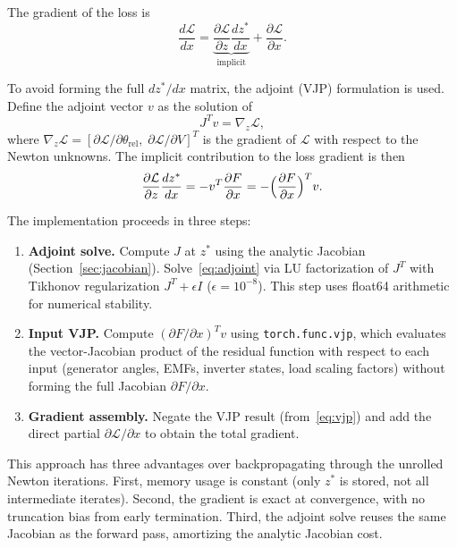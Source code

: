 \documentclass[11pt]{article}
\begin{document}
The gradient of the loss is
\begin{equation}
  \frac{d\mathcal{L}}{dx}
    = \underbrace{\frac{\partial\mathcal{L}}{\partial z}
    \frac{dz^*}{dx}}_{\text{implicit}}
    + \frac{\partial\mathcal{L}}{\partial x}.
  \label{eq:total_grad}
\end{equation}

To avoid forming the full $dz^*/dx$ matrix, the adjoint (VJP)
formulation is used.  Define the adjoint vector $v$ as the solution
of
\begin{equation}
  J^T v = \nabla_z \mathcal{L},
  \label{eq:adjoint}
\end{equation}
where $\nabla_z \mathcal{L} = [\partial\mathcal{L}/\partial\theta_{\mathrm{rel}},\;
\partial\mathcal{L}/\partial V]^T$ is the gradient of $\mathcal{L}$
with respect to the Newton unknowns.  The implicit contribution to
the loss gradient is then
\begin{equation}
  \frac{\partial \mathcal{L}}{\partial z}\frac{dz^*}{dx}
    = -v^T \frac{\partial F}{\partial x}
    = -\Bigl(\frac{\partial F}{\partial x}\Bigr)^T v.
  \label{eq:vjp}
\end{equation}

The implementation proceeds in three steps:
\begin{enumerate}
\item \textbf{Adjoint solve.}  Compute $J$ at $z^*$ using the
  analytic Jacobian (Section~\ref{sec:jacobian}).  Solve~\eqref{eq:adjoint}
  via LU factorization of $J^T$ with Tikhonov regularization
  $J^T + \epsilon I$ ($\epsilon = 10^{-8}$).  This step uses
  float64 arithmetic for numerical stability.
\item \textbf{Input VJP.}  Compute
  $(\partial F / \partial x)^T v$ using \texttt{torch.func.vjp},
  which evaluates the vector-Jacobian product of the residual
  function with respect to each input (generator angles, EMFs,
  inverter states, load scaling factors) without forming the full
  Jacobian $\partial F / \partial x$.
\item \textbf{Gradient assembly.}  Negate the VJP result
  (from~\eqref{eq:vjp}) and add the direct partial
  $\partial\mathcal{L}/\partial x$ to obtain the total gradient.
\end{enumerate}

This approach has three advantages over backpropagating through the
unrolled Newton iterations.  First, memory usage is constant (only
$z^*$ is stored, not all intermediate iterates).  Second, the gradient
is exact at convergence, with no truncation bias from early
termination.  Third, the adjoint solve reuses the same Jacobian as the
forward pass, amortizing the analytic Jacobian cost.
\end{document}
